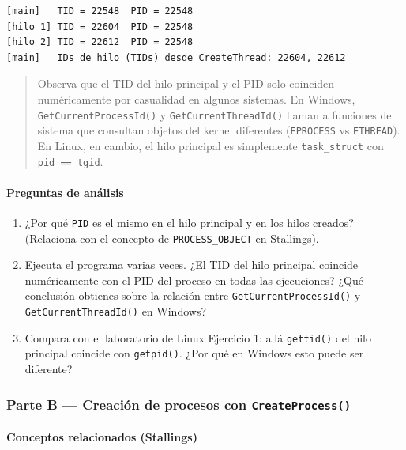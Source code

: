 \documentclass[
  spanish,
]{article}
\providecommand{\tightlist}{%
  \setlength{\itemsep}{0pt}\setlength{\parskip}{0pt}}
\begin{document}
\begin{verbatim}
[main]   TID = 22548  PID = 22548
[hilo 1] TID = 22604  PID = 22548
[hilo 2] TID = 22612  PID = 22548
[main]   IDs de hilo (TIDs) desde CreateThread: 22604, 22612
\end{verbatim}

\begin{quote}
Observa que el TID del hilo principal y el PID solo coinciden
numéricamente por casualidad en algunos sistemas. En Windows,
\texttt{GetCurrentProcessId()} y \texttt{GetCurrentThreadId()} llaman a
funciones del sistema que consultan objetos del kernel diferentes
(\texttt{EPROCESS} vs \texttt{ETHREAD}). En Linux, en cambio, el hilo
principal es simplemente \texttt{task\_struct} con
\texttt{pid\ ==\ tgid}.
\end{quote}

\paragraph{Preguntas de análisis}\label{preguntas-de-anuxe1lisis}

\begin{enumerate}
\def\labelenumi{\arabic{enumi}.}
\tightlist
\item
  ¿Por qué \texttt{PID} es el mismo en el hilo principal y en los hilos
  creados? (Relaciona con el concepto de \texttt{PROCESS\_OBJECT} en
  Stallings).
\item
  Ejecuta el programa varias veces. ¿El TID del hilo principal coincide
  numéricamente con el PID del proceso en todas las ejecuciones? ¿Qué
  conclusión obtienes sobre la relación entre
  \texttt{GetCurrentProcessId()} y \texttt{GetCurrentThreadId()} en
  Windows?
\item
  Compara con el laboratorio de Linux Ejercicio 1: allá
  \texttt{gettid()} del hilo principal coincide con \texttt{getpid()}.
  ¿Por qué en Windows esto puede ser diferente?
\end{enumerate}

\subsubsection{\texorpdfstring{Parte B --- Creación de procesos con
\texttt{CreateProcess()}}{Parte B --- Creación de procesos con CreateProcess()}}\label{parte-b-creaciuxf3n-de-procesos-con-createprocess}

\paragraph{Conceptos relacionados
(Stallings)}\label{conceptos-relacionados-stallings-1}
\end{document}
